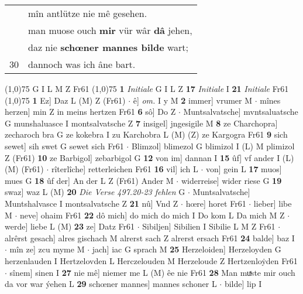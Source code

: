 \documentclass[8pt,a4paper,notitlepage]{article}
\begin{document}
\begin{table}[ht]
\begin{minipage}[t]{0.5\linewidth}
\begin{tabular}{rl}
 & mîn antlütze nie mê gesehen.\\ 
 & man muose ouch \textbf{mir} vür wâr \textbf{dâ} jehen,\\ 
 & daz nie \textbf{schœner mannes bilde} wart;\\ 
30 & dannoch was ich âne bart.\\ 
\end{tabular}
\scriptsize
\line(1,0){75} \newline
G I L M Z Fr61 \newline
\line(1,0){75} \newline
\textbf{1} \textit{Initiale} G I L Z  \textbf{17} \textit{Initiale} I  \textbf{21} \textit{Initiale} Fr61  \newline
\line(1,0){75} \newline
\textbf{1} Ez] Daz L (M) Z (Fr61)  $\cdot$ ê] \textit{om.} I y M \textbf{2} immer] vrumer M  $\cdot$ mînes herzen] min Z in meins hertzen Fr61 \textbf{6} sô] Do Z  $\cdot$ Muntsalvatsche] mvntsaluatsche G munshaluasce I montsalvatsche Z \textbf{7} insigel] jngesigile M \textbf{8} ze Charchopra] zecharoch bra G ze kokebra I zu Karchobra L (M) (Z) ze Kargogra Fr61 \textbf{9} sich sewet] sih swet G sewet sich Fr61  $\cdot$ Blimzol] blimezol G blimizol I (L) M plimizol Z (Fr61) \textbf{10} ze Barbigol] zebarbigol G \textbf{12} von im] dannan I \textbf{15} ûf] vf ander I (L) (M) (Fr61)  $\cdot$ rîterlîche] retterleichen Fr61 \textbf{16} vil] ich L  $\cdot$ von] gein L \textbf{17} muos] mues G \textbf{18} ûf der] An der L Z (Fr61) Ander M  $\cdot$ widerreise] wider riese G \textbf{19} swaz] waz L (M) \textbf{20} \textit{Die Verse 497.20-23 fehlen} G   $\cdot$ Muntsalvatsche] Muntshalvasce I montsalvatsche Z \textbf{21} nû] Vnd Z  $\cdot$ hœre] horet Fr61  $\cdot$ lieber] libe M  $\cdot$ neve] ohaim Fr61 \textbf{22} dô mich] do mich do mich I Do kom L Da mich M Z  $\cdot$ werde] liebe L (M) \textbf{23} ze] Datz Fr61  $\cdot$ Sibiljen] Sibilien I Sibilie L M Z Fr61  $\cdot$ alrêrst gesach] alres gischach M alrerst sach Z alrerst ersach Fr61 \textbf{24} balde] baz I  $\cdot$ mîn ze] zcu myme M  $\cdot$ jach] iac G sprach M \textbf{25} Herzeloiden] Herzeloyden G herzenlauden I Hertzelovden L Herczelouden M Herzeloude Z Hertzenloẏden Fr61  $\cdot$ sînem] sinen I \textbf{27} nie mê] niemer me L (M) êe nie Fr61 \textbf{28} Man muͯste mir ouch da vor war ýehen L \textbf{29} schœner mannes] mannes schoner L  $\cdot$ bilde] lip I \newline
\end{minipage}
\hspace{0.5cm}

\end{table}
\end{document}
